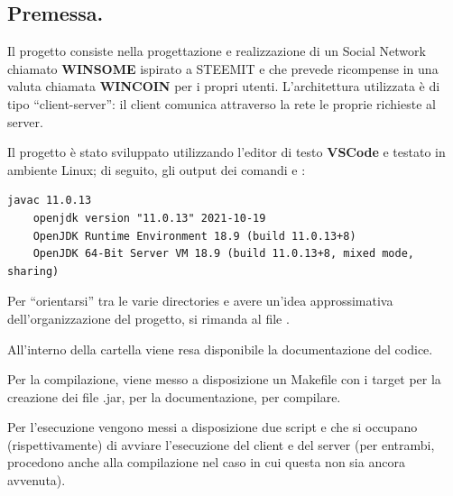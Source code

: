 \documentclass[11pt, italian, openany]{book}
\begin{document}
\begin{sloppypar}
\subsection{Premessa.}
Il progetto consiste nella progettazione e realizzazione di un Social Network chiamato \textbf{WINSOME} ispirato a STEEMIT e che prevede
ricompense in una valuta chiamata \textbf{WINCOIN} per i propri utenti. L'architettura utilizzata \`e di tipo ``client-server'': il client
comunica attraverso la rete le proprie richieste al server.

Il progetto \`e stato sviluppato utilizzando l'editor di testo \textbf{VSCode} e testato in ambiente Linux; di seguito, gli output dei comandi
 e :
\begin{lstlisting}[style=code]
	javac 11.0.13
	openjdk version "11.0.13" 2021-10-19
	OpenJDK Runtime Environment 18.9 (build 11.0.13+8)
	OpenJDK 64-Bit Server VM 18.9 (build 11.0.13+8, mixed mode, sharing)
\end{lstlisting}
Per ``orientarsi'' tra le varie directories e avere un'idea approssimativa dell'organizzazione del progetto, si rimanda al file
.

All'interno della cartella  viene resa disponibile la documentazione del codice.

Per la compilazione, viene messo a disposizione un Makefile con i target  per la creazione dei file .jar,  per
la documentazione,  per compilare.

Per l'esecuzione vengono messi a disposizione due script  e  che si occupano (rispettivamente)
di avviare l'esecuzione del client e del server (per entrambi, procedono anche alla compilazione nel caso in cui questa non sia ancora
avvenuta).


\end{sloppypar}
\end{document}
